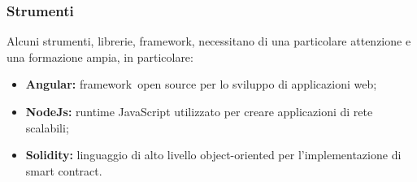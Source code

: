         \subsubsection {Strumenti}
        Alcuni strumenti, librerie, framework\glo, necessitano di una particolare attenzione e una formazione ampia, in particolare:
        \begin {itemize}
          \item \textbf{Angular:} framework\glo\ open source per lo sviluppo di applicazioni web;
          \item \textbf{NodeJs: } runtime JavaScript utilizzato per creare applicazioni di rete scalabili;
          \item \textbf{Solidity: } linguaggio di alto livello object-oriented per l'implementazione di smart contract\glo.
        \end {itemize}